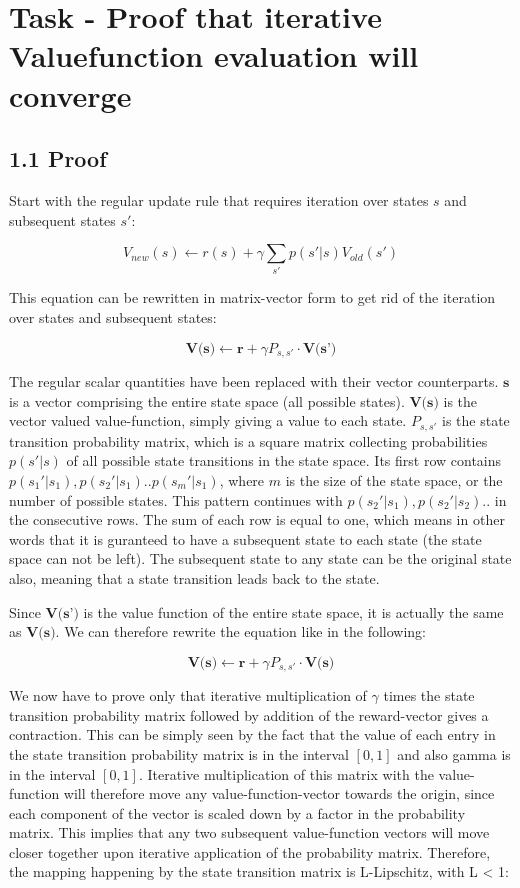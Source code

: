 
\section{Task - Proof that iterative Valuefunction evaluation will converge}



\subsection*{1.1 Proof}
 Start with the regular update rule that requires iteration over states $s$ and subsequent states $s'$: 


$$
V_{new} (s) \leftarrow r(s) + \gamma \sum_{s'} p(s' \vert s) V_{old}(s')
$$



This equation can be rewritten in matrix-vector form to get rid of the iteration over states and subsequent states:

$$
\textbf{V(s)} \leftarrow \textbf{r} + \gamma P_{s,s'} \cdot \textbf{V(s')}
$$



The regular scalar quantities have been replaced with their vector counterparts. $\textbf{s}$ is a vector comprising the entire state space (all possible states). $\textbf{V(s)}$ is the vector valued value-function, simply giving a value to each state. $P_{s,s'}$ is the state transition probability matrix, which is a square matrix collecting probabilities $p(s' \vert s)$ of all possible state transitions in the state space. Its first row contains $p(s_1' \vert s_1), p(s_2' \vert s_1) .. p(s_m' \vert s_1)$, where $m$ is the size of the state space, or the number of possible states.  This pattern continues with $p(s_2' \vert s_1), p(s_2' \vert s_2) ..$ in the consecutive rows. The sum of each row is equal to one, which means in other words that it is guranteed to have a subsequent state to each state (the state space can not be left). The subsequent state to any state can be the original state also, meaning that a state transition leads back to the state.


Since $\textbf{V(s')}$ is the value function of the entire state space, it is actually the same as $\textbf{V(s)}$. We can therefore rewrite the equation like in the following:


$$
\textbf{V(s)} \leftarrow \textbf{r} + \gamma P_{s,s'} \cdot \textbf{V(s)}
$$

We now have to prove only that iterative multiplication of $\gamma$ times the state transition probability matrix followed by addition of the reward-vector gives a contraction. This can be simply seen by the fact that the value of each entry in the state transition probability matrix is in the interval $[0, 1]$ and also gamma is in the interval $[0, 1]$. Iterative multiplication of this matrix with the value-function will therefore move any value-function-vector towards the origin, since each component of the vector is scaled down by a factor in the probability matrix. This implies that any two subsequent value-function vectors will move closer together upon iterative application of the probability matrix. Therefore, the mapping happening by the state transition matrix is L-Lipschitz, with L < 1: 

